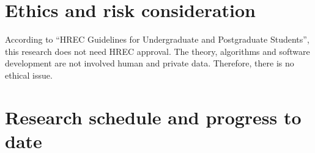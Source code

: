 \section{Ethics and risk consideration}
According to “HREC Guidelines for Undergraduate and Postgraduate Students”, this research does not need HREC approval. The theory, algorithms and software development are not involved human and private data. Therefore, there is no ethical issue.

\section{Research schedule and progress to date}
